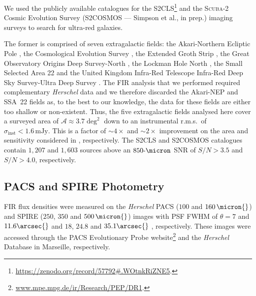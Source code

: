 \documentclass[a4paper, fleqn, usenatbib]{mnras}
\newcommand{\herschel}{\textit{Herschel}}
\newcommand{\millijanksy}{\text{mJy}}
\newcommand{\scuba}{\mbox{\textsc{Scuba}-2}}
\newcommand{\urgs}{ultra-red galaxies}
\begin{document}
We used the publicly available catalogues for the S2CLS\footnote{%
  \url{https://zenodo.org/record/57792\#.WOtnkRiZNE5}.}
\citep{geach17} and the \scuba{} Cosmic Evolution Survey (S2COSMOS --- Simpson et al., in prep.) imaging surveys to search for \urgs{}.

The former is comprised of seven extragalactic fields: the Akari-Northern Ecliptic Pole \citep[Akari-NEP ---][]{takagi09}, the Cosmological Evolution Survey \citep[COSMOS ---][which was further imaged during S2COSMOS]{scoville07}, the Extended Groth Strip \citep[EGS ---][]{groth94}, the Great Observatory Origins Deep Survey-North \citep[GOODS--N ---][]{wang04}, the Lockman Hole North \citep[LHN ---][]{dickey90}, the Small Selected Area 22 \citep[SSA~22 ---][]{lilly91} and the United Kingdom Infra-Red Telescope \citep[UKIRT ---][]{casali07} Infra-Red Deep Sky Survey-Ultra Deep Survey \citep[UKIDSS--UDS, or simply UDS ---][]{lawrence07}.
The FIR analysis that we performed required complementary \herschel{} data and we therefore discarded the Akari-NEP and SSA~22 fields as, to the best to our knowledge, the data for these fields are either too shallow or non-existent.
Thus, the five extragalactic fields analysed here cover a surveyed area of $\mathcal{A}\approx3.7\deg^2$ down to an instrumental r.m.s.\ of $\sigma_{\text{inst}}<1.6\,\millijanksy{}$.
This is a factor of $\sim4\times$ and $\sim2\times$ improvement on the area and sensitivity considered in , respectively.
The S2CLS and S2COSMOS catalogues contain $1{,}207$ and $1{,}603$ sources above an $850\text{-}\micron$ SNR of $S/N>3.5$ and $S/N>4.0$, respectively.

\subsection{PACS and SPIRE Photometry}

FIR flux densities were measured on the \herschel{} PACS ($100$ and $160\,\micron{}$) and SPIRE ($250$, $350$ and $500\,\micron{}$) images with PSF FWHM of $\theta=7$ and $11.6\arcsec{}$ \citep{ibar10} and $18$, $24.8$ and $35.1\arcsec{}$ \citep{nguyen10}, respectively.
These images were accessed through the PACS Evolutionary Probe website\footnote{%
  \url{www.mpe.mpg.de/ir/Research/PEP/DR1}.}
\citep{lutz11} and the \herschel{} Database in Marseille, respectively.
\end{document}
